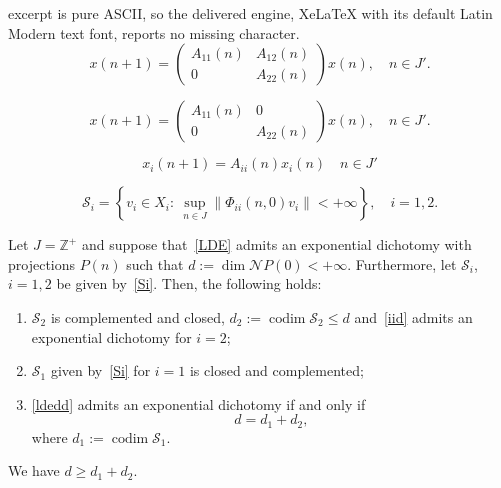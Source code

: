 \documentclass[10pt,a4paper]{amsart}
\DeclareMathOperator{\codim}{codim}
\begin{document}
excerpt is pure ASCII, so the delivered engine, XeLaTeX with its default Latin Modern text font, reports no missing character.
\begin{equation}\label{LDE}
x(n+1)=\begin{pmatrix}
A_{11}(n) & A_{12}(n)\\
0 & A_{22}(n)
\end{pmatrix} x(n), \quad n\in J'.
\end{equation}

\begin{equation}\label{ldedd}
    x(n+1)=\begin{pmatrix}
A_{11}(n) & 0\\
0 & A_{22}(n)
    \end{pmatrix} x(n), \quad n\in J'.
\end{equation}

\begin{equation}\label{iid}
x_i(n+1)=A_{ii}(n)x_i(n) \quad n\in J'
\end{equation}

\begin{equation}\label{Si}
\mathcal S_i=\left \{v_i\in X_i: \ \sup_{n\in J}\|\Phi_{ii}(n, 0)v_i\|<+\infty \right \}, \quad i=1, 2.
\end{equation}

\begin{theorem}\label{thm7}
Let $J=\mathbb Z^+$ and suppose that~\eqref{LDE} admits an exponential dichotomy with projections $P(n)$ such that $d:=\dim \mathcal N P(0)<+\infty$. Furthermore, let $\mathcal S_i$, $i=1, 2$ be given by~\eqref{Si}.  Then, the following holds:
\begin{enumerate}
    \item  $\mathcal S_2$ is complemented and closed,  $d_2:=\codim \mathcal S_2 \le d$ and~\eqref{iid} admits an exponential dichotomy for $i=2$;
    \item $\mathcal S_1$ given by~\eqref{Si} for $i=1$ is closed and complemented;
    \item \eqref{ldedd} admits an exponential dichotomy if and only if
    \begin{equation}\label{dddeq}d=d_1+d_2,\end{equation} where $d_1:=\codim \mathcal S_1$.
    \end{enumerate} 
\end{theorem}

\begin{lemma}\label{ddd}
We have $d\ge d_1+d_2$.
\end{lemma}
\end{document}
